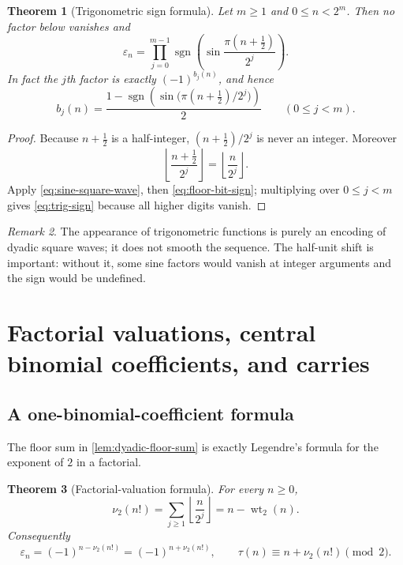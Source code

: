 \documentclass[11pt,oneside]{article}
\newtheorem{theorem}{Theorem}[section]
\theoremstyle{definition}
\theoremstyle{remark}
\newtheorem{remark}[theorem]{Remark}
\newcommand{\wt}{\operatorname{wt}_2}
\newcommand{\vtwo}{\nu_2}
\newcommand{\sgn}{\operatorname{sgn}}
\begin{document}
\begin{theorem}[Trigonometric sign formula]
\label{thm:trig-sign}
Let $m\ge1$ and $0\le n<2^m$.  Then no factor below vanishes and
\begin{equation}
  \boxed{\displaystyle
  \varepsilon_n=
  \prod_{j=0}^{m-1}
  \sgn\!\left(
     \sin\frac{\pi(n+\tfrac12)}{2^j}
  \right).}                                                 \label{eq:trig-sign}
\end{equation}
In fact the $j$th factor is exactly $(-1)^{b_j(n)}$, and hence
\begin{equation}
  b_j(n)=\frac{1-
  \sgn\!\left(\sin\bigl(\pi(n+\tfrac12)/2^j\bigr)\right)}2
  \qquad(0\le j<m).                                        \label{eq:trig-bit}
\end{equation}
\end{theorem}

\begin{proof}
Because $n+\tfrac12$ is a half-integer, $(n+\tfrac12)/2^j$ is never an integer.
Moreover
\[
 \left\lfloor\frac{n+\tfrac12}{2^j}\right\rfloor
 =\left\lfloor\frac n{2^j}\right\rfloor.
\]
Apply \eqref{eq:sine-square-wave}, then
\eqref{eq:floor-bit-sign}; multiplying over $0\le j<m$ gives
\eqref{eq:trig-sign} because all higher digits vanish.
\end{proof}

\begin{remark}
The appearance of trigonometric functions is purely an encoding of dyadic
square waves; it does not smooth the sequence.  The half-unit shift is important:
without it, some sine factors would vanish at integer arguments and the sign
would be undefined.
\end{remark}

\section{Factorial valuations, central binomial coefficients, and carries}
\label{sec:valuations}

\subsection{A one-binomial-coefficient formula}

The floor sum in \cref{lem:dyadic-floor-sum} is exactly Legendre's formula for
the exponent of $2$ in a factorial.

\begin{theorem}[Factorial-valuation formula]
\label{thm:factorial-valuation}
For every $n\ge0$,
\begin{equation}
  \vtwo(n!)=\sum_{j\ge1}\left\lfloor\frac n{2^j}\right\rfloor
            =n-\wt(n).                                     \label{eq:legendre-two}
\end{equation}
Consequently
\begin{equation}
  \boxed{\displaystyle
  \varepsilon_n=(-1)^{n-\vtwo(n!)}=(-1)^{n+\vtwo(n!)},
  \qquad
  \tau(n)\equiv n+\vtwo(n!)\pmod2.}                       \label{eq:factorial-sign}
\end{equation}
\end{theorem}
\end{document}
